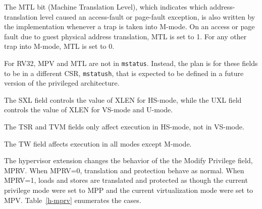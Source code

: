 The MTL bit (Machine Translation Level), which indicates which address-translation level
caused an access-fault or page-fault exception, is also written by the implementation whenever a trap
is taken into M-mode.
On an access or page fault due to guest physical address translation, MTL is
set to 1.
For any other trap into M-mode, MTL is set to 0.

\begin{commentary}
For RV32, MPV and MTL are not in {\tt mstatus}.
Instead, the plan is for these fields to be in a different CSR, {\tt mstatush},
that is expected to be defined in a future version of the privileged
architecture.
\end{commentary}

The SXL field controls the value of XLEN for HS-mode, while
the UXL field controls the value of XLEN for VS-mode and U-mode.

The TSR and TVM fields only affect execution in HS-mode, not in VS-mode.

The TW field affects execution in all modes except M-mode.

The hypervisor extension changes the behavior of the the Modify Privilege
field, MPRV.  When MPRV=0, translation and protection behave as normal.  When
MPRV=1, loads and stores are translated and protected as though the current
privilege mode were set to MPP and the current virtualization mode were set to
MPV.  Table~\ref{h-mprv} enumerates the cases.

